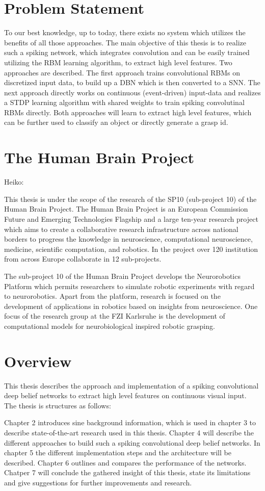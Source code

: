 \section{Problem Statement}

To our best knowledge, up to today, there exists no system which utilizes the benefits of all those approaches. 
The main objective of this thesis is to realize such a spiking network, which integrates convolution and can be easily trained utilizing the RBM learning algorithm, to extract high level features. 
Two approaches are described. 
The first approach trains convolutional RBMs on discretized input data, to build up a DBN which is then converted to a SNN. 
The next approach directly works on continuous (event-driven) input-data and realizes a STDP learning algorithm with shared weights to train spiking convolutinal RBMs directly. 
Both approaches will learn to extract high level features, which can be further used to classify an object or directly generate a grasp id. 

\section{The Human Brain Project}

Heiko:

This thesis is under the scope of the research of the SP10 (sub-project 10) of the Human Brain
Project. The Human Brain Project is an European Commission Future and Emerging Technologies Flagship and a large ten-year research project which aims to create a collaborative research infrastructure across national borders to progress the knowledge in neuroscience, computational neuroscience, medicine, scientific computation, and robotics. In the project over 120
institution from across Europe collaborate in 12 sub-projects.

The sub-project 10 of the Human Brain Project develops the Neurorobotics Platform which
permits researchers to simulate robotic experiments with regard to neurorobotics. Apart from the
platform, research is focused on the development of applications in robotics based on insights
from neuroscience. One focus of the research group at the FZI Karlsruhe is the development of
computational models for neurobiological inspired robotic grasping.


\section{Overview}

This thesis describes the approach and implementation of a spiking convolutional deep belief networks to extract high level features on continuous visual input. The thesis is structures as follows:

Chapter 2 introduces sine background information, which is used in chapter 3 to describe state-of-the-art research used in this thesis. Chapter 4 will describe the different approaches to build such a spiking convolutional deep belief networks. In chapter 5 the different implementation steps and the architecture will be described. Chapter 6 outlines and compares the performance of the networks. Chatper 7 will conclude the gathered insight of this thesis, state its limitations and give suggestions for further improvements and research.  